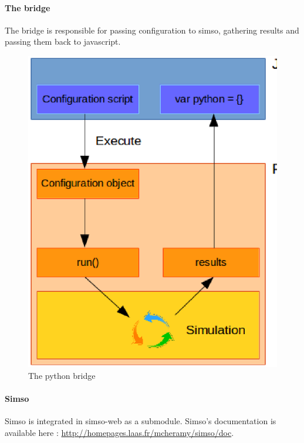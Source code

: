 \documentclass[10pt,a4paper]{article}
\begin{document}
\paragraph{The bridge}
The bridge is responsible for passing configuration to simso, gathering results and passing them back to javascript.
\begin{figure}[h]
\centering
\includegraphics[scale=0.50]{figure2.eps}
\caption{The python bridge}
\end{figure}


\paragraph{Simso}
Simso is integrated in simso-web as a submodule. Simso's documentation is available here : \href{"http://homepages.laas.fr/mcheramy/simso/doc"}{http://homepages.laas.fr/mcheramy/simso/doc}.
\end{document}
